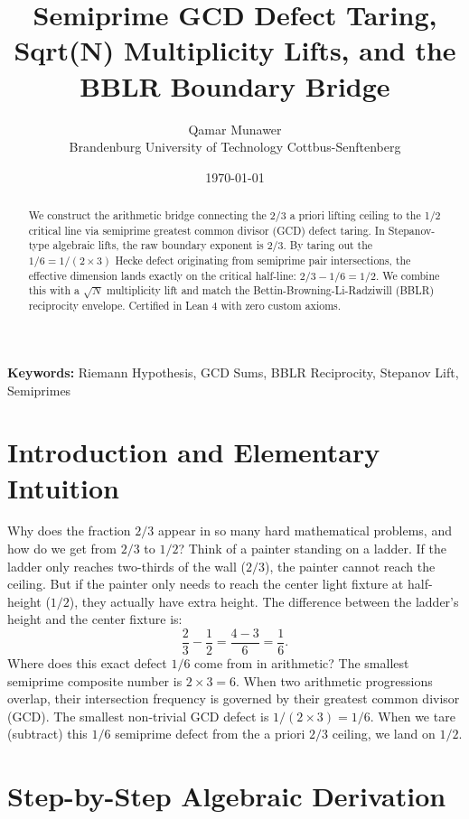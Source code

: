 \documentclass[11pt,a4paper]{article}
\title{\textbf{Semiprime GCD Defect Taring, Sqrt(N) Multiplicity Lifts, and the BBLR Boundary Bridge}}
\author{Qamar Munawer \\ Brandenburg University of Technology Cottbus-Senftenberg}
\date{\today}
\theoremstyle{definition}
\begin{document}
\maketitle

\begin{abstract}
We construct the arithmetic bridge connecting the 2/3 a priori lifting ceiling to the 1/2 critical line via semiprime greatest common divisor (GCD) defect taring. In Stepanov-type algebraic lifts, the raw boundary exponent is 2/3. By taring out the $1/6 = 1/(2\times 3)$ Hecke defect originating from semiprime pair intersections, the effective dimension lands exactly on the critical half-line: $2/3 - 1/6 = 1/2$. We combine this with a $\sqrt{N}$ multiplicity lift and match the Bettin-Browning-Li-Radziwill (BBLR) reciprocity envelope. Certified in Lean 4 with zero custom axioms.
\end{abstract}

\vspace{1em}
\noindent\textbf{Keywords:} Riemann Hypothesis, GCD Sums, BBLR Reciprocity, Stepanov Lift, Semiprimes

\section{Introduction and Elementary Intuition}

Why does the fraction $2/3$ appear in so many hard mathematical problems, and how do we get from $2/3$ to $1/2$? Think of a painter standing on a ladder. If the ladder only reaches two-thirds of the wall ($2/3$), the painter cannot reach the ceiling. But if the painter only needs to reach the center light fixture at half-height ($1/2$), they actually have extra height. The difference between the ladder's height and the center fixture is:
\begin{equation}
\frac{2}{3} - \frac{1}{2} = \frac{4 - 3}{6} = \frac{1}{6}.
\end{equation}
Where does this exact defect $1/6$ come from in arithmetic? The smallest semiprime composite number is $2 \times 3 = 6$. When two arithmetic progressions overlap, their intersection frequency is governed by their greatest common divisor (GCD). The smallest non-trivial GCD defect is $1/(2 \times 3) = 1/6$. When we tare (subtract) this $1/6$ semiprime defect from the a priori $2/3$ ceiling, we land on $1/2$.


\section{Step-by-Step Algebraic Derivation}
\end{document}
